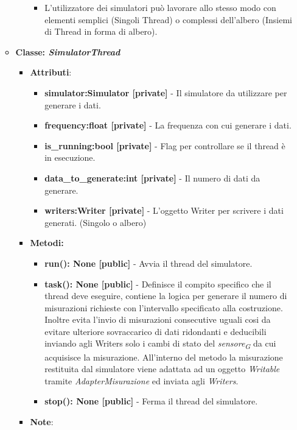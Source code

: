 \begin{itemize}
\begin{itemize}
\begin{itemize}
\begin{itemize}
                \item L'utilizzatore dei simulatori può lavorare allo stesso modo con elementi semplici (Singoli Thread) o complessi dell'albero (Insiemi di Thread in forma di albero).
            \end{itemize}
    \end{itemize}
    \item{\textbf{Classe: \textit{SimulatorThread}}}
    \begin{itemize}
    \item\textbf{Attributi}:
        \begin{itemize}
        \item \textbf{simulator:Simulator [private]} - Il simulatore da utilizzare per generare i dati.
        \item \textbf{frequency:float [private]} - La frequenza con cui generare i dati.
        \item \textbf{is\_running:bool [private]} - Flag per controllare se il thread è in esecuzione.
        \item \textbf{data\_to\_generate:int [private]} - Il numero di dati da generare.
        \item \textbf{writers:Writer [private]} - L'oggetto Writer per scrivere i dati generati. (Singolo o albero)
        \end{itemize}
    \item \textbf{Metodi: }
        \begin{itemize}
        \item \textbf{run(): None [public]} - Avvia il thread del simulatore.
        \item \textbf{task(): None [public]} - Definisce il compito specifico che il thread deve eseguire, contiene la logica per generare il numero di misurazioni richieste con l'intervallo specificato alla costruzione.
        Inoltre evita l'invio di misurazioni consecutive uguali cosi da evitare ulteriore sovraccarico di dati ridondanti e deducibili inviando agli Writers solo i cambi di stato del \textit{sensore}\textsubscript{\textit{G}} da cui acquisisce la misurazione.
        All'interno del metodo la misurazione restituita dal simulatore viene adattata ad un oggetto \textit{Writable} tramite \textit{AdapterMisurazione} ed inviata agli \textit{Writers}.
        \item \textbf{stop(): None [public]} - Ferma il thread del simulatore.
        \end{itemize}
    \item\textbf{Note}:

\end{itemize}
\end{itemize}
\end{itemize}
